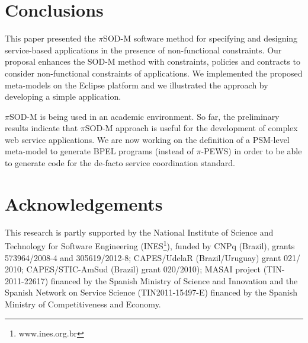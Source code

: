 \documentclass{llncs}
\theoremstyle{plain}
\theoremstyle{plain}
\theoremstyle{plain}
\begin{document}
\section{Conclusions}
\label{sec:conclusions}
%

This paper presented the $\pi$SOD-M software method for specifying and designing service-based applications in the presence of  non-functional constraints. 
Our proposal enhances the SOD-M method with constraints, policies and contracts  to consider non-functional constraints of applications.
We implemented the proposed meta-models on the Eclipse platform and we illustrated the approach by developing a simple application.

$\pi$SOD-M is being used in an academic environment.
So far, the preliminary results indicate that $\pi$SOD-M approach is useful for the development of complex web service applications. 
We are now working on the definition of a PSM-level meta-model to generate BPEL programs (instead of $\pi$-PEWS) in order to be able to generate code for the de-facto service coordination standard. 



\section*{Acknowledgements}
\small
This research is partly supported by the National Institute of Science and Technology for Software Engineering (INES\footnote{www.ines.org.br}), funded by CNPq (Brazil), grants 573964/2008-4 and 305619/2012-8; CAPES/UdelaR (Brazil/Uruguay) grant 021/ 2010; CAPES/STIC-AmSud (Brazil) grant 020/2010); MASAI project (TIN-2011-22617) financed by the Spanish Ministry of Science and Innovation and the Spanish Network on Service Science (TIN2011-15497-E) financed by the Spanish Ministry of Competitiveness and Economy. 

\normalsize  

 
\end{document}
